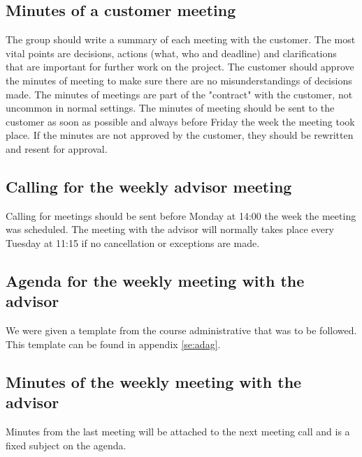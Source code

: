 \subsection{Minutes of a customer meeting}
The group should write a summary of each meeting with the customer. The most vital points are decisions, actions (what, who and deadline) and clarifications that are important for further work on the project. The customer should approve the minutes of meeting to make sure there are no misunderstandings of decisions made. The minutes of meetings are part of the "contract" with the customer, not uncommon in normal settings.
\newline
\newline
The minutes of meeting should be sent to the customer as soon as possible and always before Friday the week the meeting took place. If the minutes are not approved by the customer, they should be rewritten and resent for approval.

\subsection{Calling for the weekly advisor meeting}
Calling for meetings should be sent before Monday at 14:00 the week the meeting was scheduled. The meeting with the advisor will normally takes place every Tuesday at 11:15 if no cancellation or exceptions are made.

\subsection{Agenda for the weekly meeting with the advisor}
We were given a template from the course administrative that was to be followed. This template can be found in appendix \ref{se:adag}.

\subsection{Minutes of the weekly meeting with the advisor}
Minutes from the last meeting will be attached to the next meeting call and is a fixed subject on the agenda.


